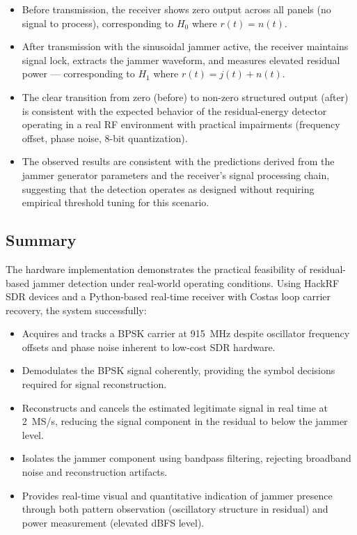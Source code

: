 \documentclass{article}
\begin{document}
\begin{itemize}
\item Before transmission, the receiver shows zero output across all panels (no signal to process), corresponding to $H_0$ where $r(t) = n(t)$.
\item After transmission with the sinusoidal jammer active, the receiver maintains signal lock, extracts the jammer waveform, and measures elevated residual power — corresponding to $H_1$ where $r(t) = j(t) + n(t)$.
\item The clear transition from zero (before) to non-zero structured output (after) is consistent with the expected behavior of the residual-energy detector operating in a real RF environment with practical impairments (frequency offset, phase noise, 8-bit quantization).
\item The observed results are consistent with the predictions derived from the jammer generator parameters and the receiver's signal processing chain, suggesting that the detection operates as designed without requiring empirical threshold tuning for this scenario.
\end{itemize}

\subsection{Summary}

The hardware implementation demonstrates the practical feasibility of residual-based jammer detection under real-world operating conditions. Using HackRF SDR devices and a Python-based real-time receiver with Costas loop carrier recovery, the system successfully:

\begin{itemize}
\item Acquires and tracks a BPSK carrier at 915~MHz despite oscillator frequency offsets and phase noise inherent to low-cost SDR hardware.
\item Demodulates the BPSK signal coherently, providing the symbol decisions required for signal reconstruction.
\item Reconstructs and cancels the estimated legitimate signal in real time at 2~MS/s, reducing the signal component in the residual to below the jammer level.
\item Isolates the jammer component using bandpass filtering, rejecting broadband noise and reconstruction artifacts.
\item Provides real-time visual and quantitative indication of jammer presence through both pattern observation (oscillatory structure in residual) and power measurement (elevated dBFS level).
\end{itemize}
\end{document}
